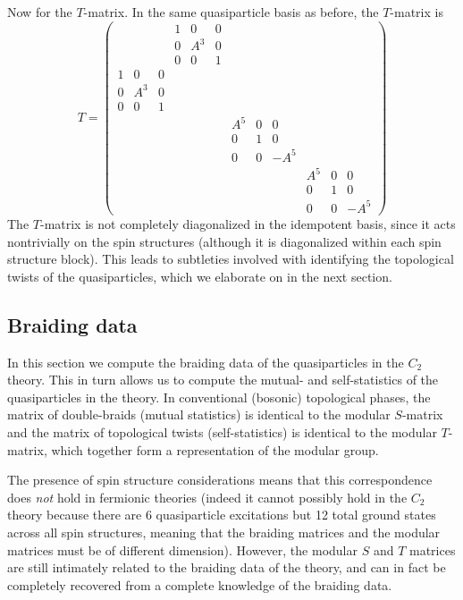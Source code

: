 \documentclass[12pt,a4paper]{article}
\newcommand\be            {\begin{equation}}
\newcommand\ee            {\end{equation}}
\begin{document}
Now for the $T$-matrix. 
In the same quasiparticle basis as before, the $T$-matrix is
\be 
T = \begin{pmatrix}   			&&&				1&0&0&		&&&			&& \\ 
					        &&&				0&A^3&0&	&&&			&&\\
					        &&& 				0&0&1&		&&&			&&\\
						1&0&0&			&&&			&&&			&& \\
						0&A^3&0&		&&&			&&&			&&\\
						0&0&1&			&&&			&&&			&&\\
						&&&				&&&			A^{5}&0&0&	&&\\
						&&&				&&&			0&1&0&		&&\\
						&&&				&&&			0&0&-A^{5}&	&&\\
						&&&				&&&			&&&			A^{5}&0&0\\
						&&&				&&&			&&&			0&1&0 \\ 
						&&&				&&&			&&&			0&0&-A^{5} \end{pmatrix}\ee	
The $T$-matrix is not completely diagonalized in the idempotent basis, since it acts nontrivially on the spin structures (although it is diagonalized within each spin structure block). 
This leads to subtleties involved with identifying the topological twists of the quasiparticles, 
which we elaborate on in the next section. 




\subsection{Braiding data} \label{C2_braiding}

In this section we compute the braiding data of the quasiparticles in the $C_2$ theory.
This in turn allows us to compute the mutual- and self-statistics of the quasiparticles in the theory.
In conventional (bosonic) topological phases, the matrix of double-braids (mutual statistics) 
is identical to the modular $S$-matrix and the matrix of topological twists (self-statistics) is identical to the 
modular $T$-matrix, which together form a representation of the modular group.  

The presence of spin structure considerations means that this correspondence does {\it not} 
hold in fermionic theories (indeed it cannot possibly hold in the $C_2$ theory because there are 6 quasiparticle excitations but 12 total ground states across all spin structures, meaning that the braiding matrices and the modular matrices must be of different dimension). 
However, the modular $S$ and $T$ matrices are still intimately related to the braiding data of the theory, and
can in fact be completely recovered from a complete knowledge of the braiding data.
\end{document}
